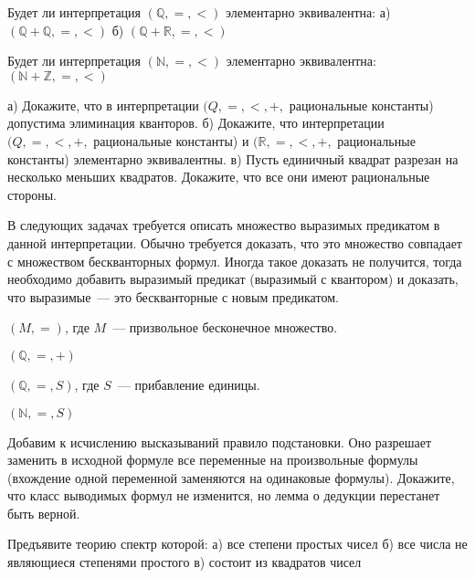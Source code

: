 \setcounter{curtask}{28}



\begin{task}
    Будет ли интерпретация $(\mathbb{Q}, =, <)$ элементарно
    эквивалентна:
    а) $(\mathbb{Q} + \mathbb{Q}, =, <)$
    б) $(\mathbb{Q} + \mathbb{R}, =, <)$
\end{task}

\begin{task}
    Будет ли интерпретация $(\mathbb{N}, =, <)$ элементарно
    эквивалентна: $(\mathbb{N} + \mathbb{Z}, =, <)$
\end{task}

\begin{task}
    а) Докажите, что в интерпретации $(Q, =, <, +,$ рациональные
    константы) допустима элиминация кванторов.
    б) Докажите, что интерпретации $(Q, =, <, +,$ рациональные
    константы) и $(\mathbb{R}, =, <, +,$ рациональные константы)
    элементарно эквивалентны.
    в) Пусть единичный квадрат разрезан на несколько меньших
    квадратов. Докажите, что все они имеют рациональные стороны.
\end{task}


В следующих задачах требуется описать множество выразимых предикатом в
данной интерпретации. Обычно требуется доказать, что это множество
совпадает с множеством бескванторных формул. Иногда такое доказать не
получится, тогда необходимо добавить выразимый предикат (выразимый с
квантором) и доказать, что выразимые~--- это бескванторные с новым
предикатом.

\begin{task}
    $(M, =)$, где $M$~--- призвольное бесконечное множество.
\end{task}

\begin{task}
    $(\mathbb{Q}, =, +)$
\end{task}

\begin{task}
    $(\mathbb{Q}, =, S)$, где $S$~--- прибавление единицы.
\end{task}

\begin{task}
    $(\mathbb{N}, =, S)$
\end{task}





\breakline

\begin{ptask}{20}
    Добавим к исчислению высказываний правило подстановки. Оно разрешает заменить в
    исходной формуле все переменные на произвольные формулы (вхождение одной
    переменной заменяются на одинаковые формулы). Докажите, что класс выводимых
    формул не изменится, но лемма о дедукции перестанет быть верной. 
\end{ptask}


\begin{ptask}{23}
    Предъявите теорию спектр которой:
    а) все степени простых чисел
    б) все числа не являющиеся степенями простого
    в) состоит из квадратов чисел
\end{ptask}
